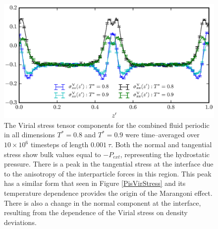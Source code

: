 \begin{figure}[h]
\centering
\includegraphics[scale=1.0]{Period10VirStress}
\caption{The Virial stress tensor components for the combined fluid periodic in all dimensions $T^{*} = 0.8$ and $T^{*} = 0.9$ were time--averaged over $10 \times 10^{6}$ timesteps of length $0.001\ \tau$.
Both the normal and tangential stress show bulk values equal to $-P_{ext}$, representing the hydrostatic pressure.
There is a peak in the tangential stress at the interface due to the anisotropy of the interparticle forces in this region.
This peak has a similar form that seen in Figure \ref{PisVirStress} and its temperature dependence provides the origin of the Marangoni effect.
There is also a change in the normal component at the interface, resulting from the dependence of the Virial stress on density deviations.
}
\label{Period10VirStress}
\end{figure}

